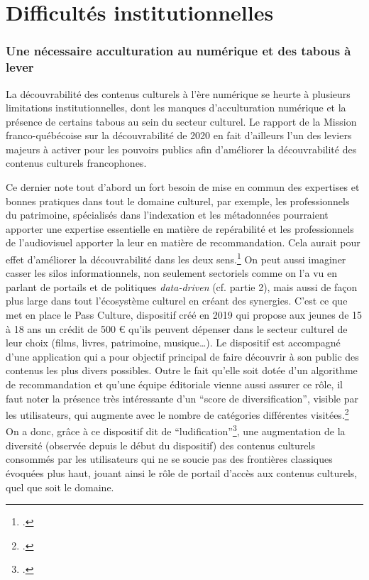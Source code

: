 \chapter{Difficultés institutionnelles}

\subsection{Une nécessaire acculturation au numérique et des tabous à lever}

La découvrabilité des contenus culturels à l’ère numérique se heurte à plusieurs limitations institutionnelles, dont les manques d’acculturation numérique et la présence de certains tabous au sein du secteur culturel. Le rapport de la Mission franco-québécoise sur la découvrabilité de 2020 en fait d’ailleurs l’un des leviers majeurs à activer pour les pouvoirs publics afin d’améliorer la découvrabilité des contenus culturels francophones. 

Ce dernier note tout d’abord un fort besoin de mise en commun des expertises et bonnes pratiques dans tout le domaine culturel, par exemple, les professionnels du patrimoine, spécialisés dans l’indexation et les métadonnées pourraient apporter une expertise essentielle en matière de repérabilité et les professionnels de l’audiovisuel apporter la leur en matière de recommandation. Cela aurait pour effet d’améliorer la découvrabilité dans les deux sens.\footcite[p. 31]{ministeresdelaculturefranceetquebec2020} On peut aussi imaginer casser les silos informationnels, non seulement sectoriels comme on l’a vu en parlant de portails et de politiques \textit{data-driven} (cf. partie 2), mais aussi de façon plus large dans tout l’écosystème culturel en créant des synergies. C’est ce que met en place le Pass Culture, dispositif créé en 2019 qui propose aux jeunes de 15 à 18 ans un crédit de 500 € qu’ils peuvent dépenser dans le secteur culturel de leur choix (films, livres, patrimoine, musique…). Le dispositif est accompagné d’une application qui a pour objectif principal de faire découvrir à son public des contenus les plus divers possibles. Outre le fait qu’elle soit dotée d’un algorithme de recommandation et qu’une équipe éditoriale vienne aussi assurer ce rôle, il faut noter la présence très intéressante d’un \enquote{score de diversification}, visible par les utilisateurs, qui augmente avec le nombre de catégories différentes visitées.\footcite{martinstocker} On a donc, grâce à ce dispositif dit de \enquote{ludification}\footcite{2024g}, une augmentation de la diversité (observée depuis le début du dispositif) des contenus culturels consommés par les utilisateurs qui ne se soucie pas des frontières classiques évoquées plus haut, jouant ainsi le rôle de portail d’accès aux contenus culturels, quel que soit le domaine.


